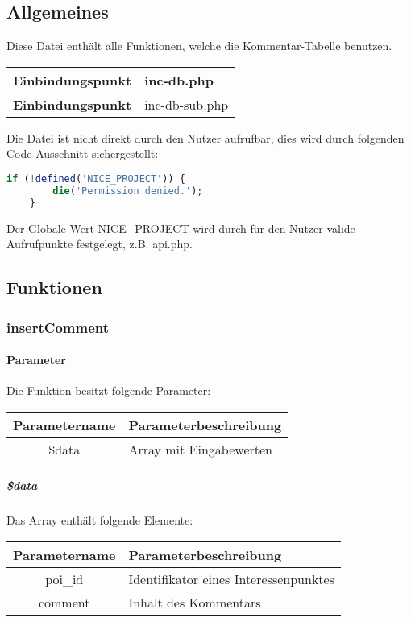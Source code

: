 \subsection{Allgemeines} Diese Datei enthält alle Funktionen, welche die Kommentar-Tabelle benutzen.
\begin{table}[H]
	\begin{tabular}{|c|p{11cm}|}
		\hline
		\textbf{Einbindungspunkt} & inc-db.php \\ \hline
		\textbf{Einbindungspunkt} & inc-db-sub.php \\ \hline
	\end{tabular}
\end{table}
Die Datei ist nicht direkt durch den Nutzer aufrufbar, dies wird durch folgenden Code-Ausschnitt sichergestellt:
\begin{lstlisting}[language=php]
	if (!defined('NICE_PROJECT')) {
		die('Permission denied.');
	}
\end{lstlisting}
Der Globale Wert {\glqq NICE\_PROJECT\grqq} wird durch für den Nutzer valide Aufrufpunkte festgelegt, z.B. {\glqq api.php\grqq}.
\newpage
\subsection{Funktionen}
\subsubsection{insertComment}
\paragraph{Parameter} Die Funktion besitzt folgende Parameter:
\begin{table}[H]
	\begin{tabular}{|c|p{11cm}|}
		\hline
		\textbf{Parametername} & \textbf{Parameterbeschreibung} \\ \hline
		\$data & Array mit Eingabewerten \\ \hline
	\end{tabular}
\end{table}
\subparagraph{\$data}Das Array enthält folgende Elemente:
\begin{table}[H]
	\begin{tabular}{|c|p{11cm}|}
		\hline
		\textbf{Parametername} & \textbf{Parameterbeschreibung} \\ \hline
		poi\_id & Identifikator eines Interessenpunktes  \\ \hline
		comment & Inhalt des Kommentars \\ \hline
	\end{tabular}
\end{table}
